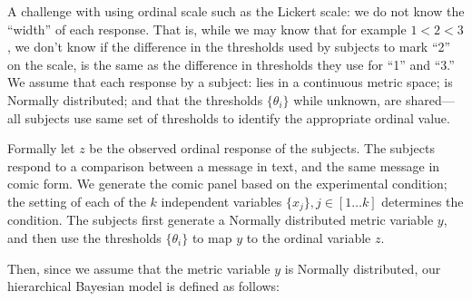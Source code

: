 A challenge with using ordinal scale such as the Lickert scale: we do not know the ``width'' of each response. That is, while we may know that for example $1<2<3$, we don't know if the difference in the thresholds used by subjects to mark ``2'' on the scale, is the same as the difference in thresholds they use for ``1'' and ``3.''  We assume that each response by a subject: lies in a continuous metric space; is Normally distributed; and that the thresholds $\{\theta_i\}$ while unknown, are shared---all subjects use same set of thresholds to identify the appropriate ordinal value.

Formally let $z$ be the observed ordinal response of the subjects. The subjects respond to a comparison between a message in text, and the same message in comic form. We generate the comic panel based on the experimental condition;
the setting of each of the $k$ independent variables $\{x_j\}, j \in [1 \ldots k]$ determines the condition. The subjects first generate a Normally distributed metric variable $y$, and then use the thresholds $\{\theta_i\}$ to map $y$ to the ordinal variable $z$.

Then, since we assume that the metric variable $y$ is Normally distributed, our hierarchical Bayesian model is defined as follows:

